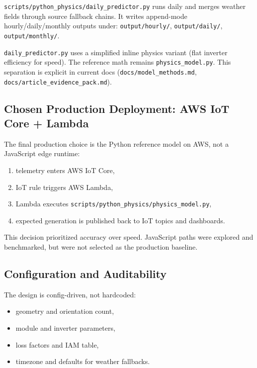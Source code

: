 \documentclass[11pt,a4paper]{article}
\newcommand{\artifact}[1]{\texttt{#1}}
\begin{document}
\artifact{scripts/python\_physics/daily\_predictor.py} runs daily and merges weather fields through source fallback chains.
It writes append-mode hourly/daily/monthly outputs under:
\artifact{output/hourly/}, \artifact{output/daily/}, \artifact{output/monthly/}.

\begin{insightbox}
\artifact{daily\_predictor.py} uses a simplified inline physics variant (flat inverter efficiency for speed).
The reference math remains \artifact{physics\_model.py}. This separation is explicit in current docs
(\artifact{docs/model\_methods.md}, \artifact{docs/article\_evidence\_pack.md}).
\end{insightbox}

\subsection{Chosen Production Deployment: AWS IoT Core + Lambda}

The final production choice is the Python reference model on AWS, not a JavaScript edge runtime:
\begin{enumerate}
  \item telemetry enters AWS IoT Core,
  \item IoT rule triggers AWS Lambda,
  \item Lambda executes \artifact{scripts/python\_physics/physics\_model.py},
  \item expected generation is published back to IoT topics and dashboards.
\end{enumerate}

This decision prioritized accuracy over speed. JavaScript paths were explored and benchmarked,
but were not selected as the production baseline.

\subsection{Configuration and Auditability}

The design is config-driven, not hardcoded:
\begin{itemize}
  \item geometry and orientation count,
  \item module and inverter parameters,
  \item loss factors and IAM table,
  \item timezone and defaults for weather fallbacks.
\end{itemize}
\end{document}
